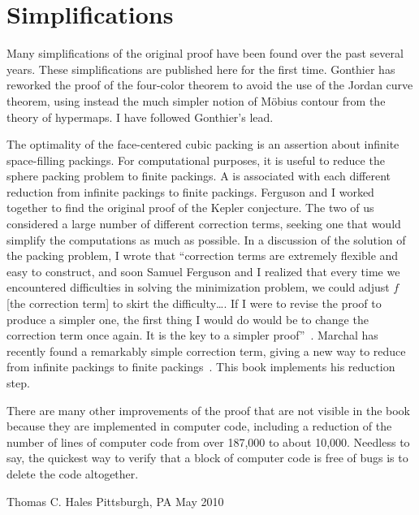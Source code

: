 \section*{Simplifications}

Many simplifications of the original proof have been found over the
past several years.  These simplifications are published here for the
first time.  Gonthier has reworked the proof of the four-color
theorem to avoid the use of the Jordan curve theorem, using instead
the much simpler notion of M\"obius contour from the theory of
hypermaps.  I have followed Gonthier's lead.

The optimality of the face-centered cubic packing is an assertion
about infinite space-filling packings.  For computational purposes, it is
useful to reduce the sphere packing problem to finite packings.  A
 is associated with each different reduction from
infinite packings to finite packings.  Ferguson and I worked together to
find the original proof of the Kepler conjecture.  The two of us considered a
large number of different correction terms, seeking one that
would simplify the computations as much as possible.  In a discussion
of the solution of the packing problem, I wrote that ``correction
terms are extremely flexible and easy to construct, and soon Samuel
Ferguson and I realized that every time we encountered difficulties in
solving the minimization problem, we could adjust $f$ [the correction
term] to skirt the difficulty\dots.  If I were to revise the proof
to produce a simpler one, the first thing I would do would be to
change the correction term once again.  It is the key to a simpler
proof''~\cite{Hales:2000:cannonballs}.  Marchal has recently found a remarkably simple 
correction term, giving a new way  to  reduce from infinite packings
to finite packings~\cite{marchal:2009}.  This book implements his reduction step.

There are many other improvements of the proof that are not visible in
the book because they are implemented in computer code, including a
reduction of the number of lines of computer code from over 187,000 to
about 10,000.  Needless to say, the quickest way to verify that a
block of computer code is free of bugs is to delete the code
altogether.




\bigskip
\hbox{}



\bigskip
\hbox{}

{
\parindent=0pt
\obeylines

Thomas C. Hales
Pittsburgh, PA
May 2010

}







